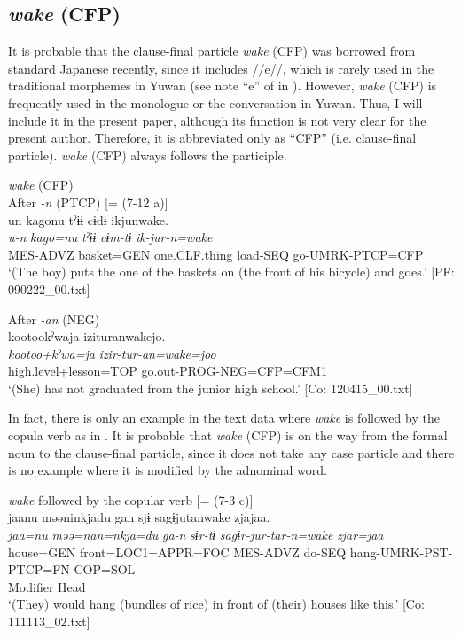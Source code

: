 \begin{xlist}
\subsection{\textit{wake} (CFP)}\label{sec:10.3.11}

It is probable that the clause-final particle \textit{wake} (CFP) was borrowed from standard Japanese recently, since it includes //e//, which is rarely used in the traditional morphemes in Yuwan (see note “e” of  in ). However, \textit{wake} (CFP) is frequently used in the monologue or the conversation in Yuwan. Thus, I will include it in the present paper, although its function is not very clear for the present author. Therefore, it is abbreviated only as “CFP” (i.e. clause-final particle). \textit{wake} (CFP) always follows the participle.

\ea\label{ex:10.57}   \textit{wake} (CFP)\\
  \ea After \textit{{}-n} (PTCP) [= (7-12 a)]\\
      \glll    un  kagonu  tˀɨɨ  cɨdɨ  ikjunwake.\\
    \textit{u-n}  \textit{kago=nu}  \textit{tˀɨɨ}  \textit{cɨm-tɨ}  \textit{ik-jur-n=wake}\\
    MES-ADVZ  basket=GEN  one.CLF.thing  load-SEQ  go-UMRK-PTCP=CFP\\
    \glt     ‘(The boy) puts the one of the baskets on (the front of his bicycle) and goes.’ [PF: 090222\_00.txt]

  \ex After \textit{{}-an} (NEG)\\
      \glll    kootookˀwaja  izituranwakejo.\\
    \textit{kootoo+kˀwa=ja}  \textit{izir-tur-an=wake=joo}\\
    high.level+lesson=TOP  go.out-PROG-NEG=CFP=CFM1\\
  \glt     ‘(She) has not graduated from the junior high school.’  [Co: 120415\_00.txt]
  \z
\z


  In fact, there is only an example in the text data where \textit{wake} is followed by the copula verb as in . It is probable that \textit{wake} (CFP) is on the way from the formal noun to the clause-final particle, since it does not take any case particle and there is no example where it is modified by the adnominal word.

\ea\label{ex:10.58}   \textit{wake} followed by the copular verb [= (7-3 c)]\\
      \gllll    jaanu  məəninkjadu  gan  sjɨ   sagɨjutanwake  zjajaa.\\
    \textit{jaa=nu}  \textit{məə=nan=nkja=du}  \textit{ga-n}  \textit{sɨr-tɨ} \textit{sagɨr-jur-tar-n=wake}  \textit{zjar=jaa}\\
    house=GEN  front=LOC1=APPR=FOC  MES-ADVZ  do-SEQ  hang-UMRK-PST-PTCP=FN  COP=SOL\\
    Modifier  Head\\
    \glt  ‘(They) would hang (bundles of rice) in front of (their) houses like this.’ [Co: 111113\_02.txt]
\z


\end{xlist}
